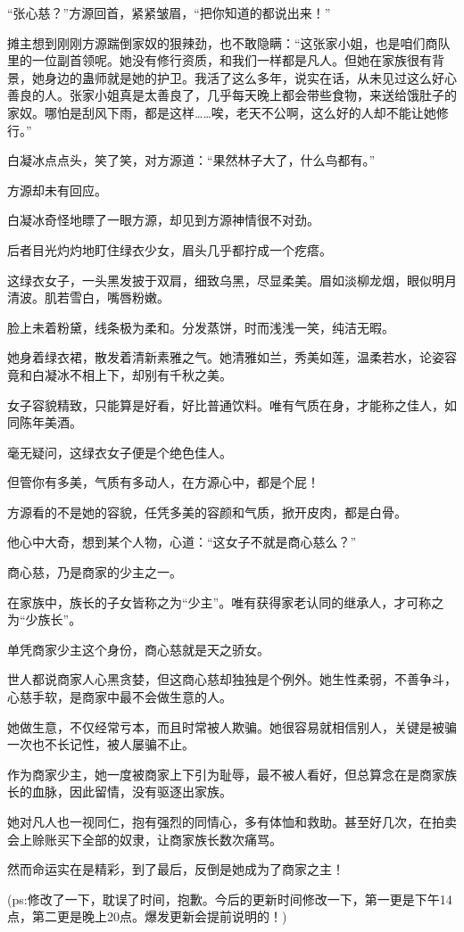 \begin{this_body}
“张心慈？”方源回首，紧紧皱眉，“把你知道的都说出来！”

摊主想到刚刚方源踹倒家奴的狠辣劲，也不敢隐瞒：“这张家小姐，也是咱们商队里的一位副首领呢。她没有修行资质，和我们一样都是凡人。但她在家族很有背景，她身边的蛊师就是她的护卫。我活了这么多年，说实在话，从未见过这么好心善良的人。张家小姐真是太善良了，几乎每天晚上都会带些食物，来送给饿肚子的家奴。哪怕是刮风下雨，都是这样……唉，老天不公啊，这么好的人却不能让她修行。”

白凝冰点点头，笑了笑，对方源道：“果然林子大了，什么鸟都有。”

方源却未有回应。

白凝冰奇怪地瞟了一眼方源，却见到方源神情很不对劲。

后者目光灼灼地盯住绿衣少女，眉头几乎都拧成一个疙瘩。

这绿衣女子，一头黑发披于双肩，细致乌黑，尽显柔美。眉如淡柳龙烟，眼似明月清波。肌若雪白，嘴唇粉嫩。

脸上未着粉黛，线条极为柔和。分发蒸饼，时而浅浅一笑，纯洁无暇。

她身着绿衣裙，散发着清新素雅之气。她清雅如兰，秀美如莲，温柔若水，论姿容竟和白凝冰不相上下，却别有千秋之美。

女子容貌精致，只能算是好看，好比普通饮料。唯有气质在身，才能称之佳人，如同陈年美酒。

毫无疑问，这绿衣女子便是个绝色佳人。

但管你有多美，气质有多动人，在方源心中，都是个屁！

方源看的不是她的容貌，任凭多美的容颜和气质，掀开皮肉，都是白骨。

他心中大奇，想到某个人物，心道：“这女子不就是商心慈么？”

商心慈，乃是商家的少主之一。

在家族中，族长的子女皆称之为“少主”。唯有获得家老认同的继承人，才可称之为“少族长”。

单凭商家少主这个身份，商心慈就是天之骄女。

世人都说商家人心黑贪婪，但这商心慈却独独是个例外。她生性柔弱，不善争斗，心慈手软，是商家中最不会做生意的人。

她做生意，不仅经常亏本，而且时常被人欺骗。她很容易就相信别人，关键是被骗一次也不长记性，被人屡骗不止。

作为商家少主，她一度被商家上下引为耻辱，最不被人看好，但总算念在是商家族长的血脉，因此留情，没有驱逐出家族。

她对凡人也一视同仁，抱有强烈的同情心，多有体恤和救助。甚至好几次，在拍卖会上赊账买下全部的奴隶，让商家族长数次痛骂。

然而命运实在是精彩，到了最后，反倒是她成为了商家之主！

(ps:修改了一下，耽误了时间，抱歉。今后的更新时间修改一下，第一更是下午14点，第二更是晚上20点。爆发更新会提前说明的！)

\end{this_body}


